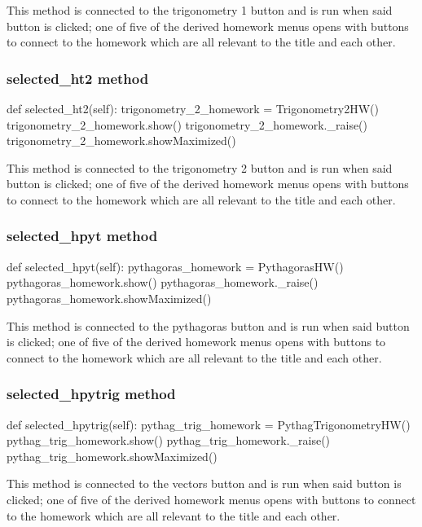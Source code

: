 This method is connected to the trigonometry 1 button and is run when said button is clicked; one of five of the derived homework menus opens with buttons to connect to the homework which are all relevant to the title and each other.

\subsubsection{selected\_ht2 method}

\begin{python}
def selected_ht2(self):
        trigonometry_2_homework = Trigonometry2HW()
        trigonometry_2_homework.show()
        trigonometry_2_homework._raise()
        trigonometry_2_homework.showMaximized()
\end{python}

This method is connected to the trigonometry 2 button and is run when said button is clicked; one of five of the derived homework menus opens with buttons to connect to the homework which are all relevant to the title and each other.

\subsubsection{selected\_hpyt method}

\begin{python}
def selected_hpyt(self):
        pythagoras_homework = PythagorasHW()
        pythagoras_homework.show()
        pythagoras_homework._raise()
        pythagoras_homework.showMaximized()
\end{python}

This method is connected to the pythagoras button and is run when said button is clicked; one of five of the derived homework menus opens with buttons to connect to the homework which are all relevant to the title and each other.

\subsubsection{selected\_hpytrig method}

\begin{python}
def selected_hpytrig(self):
        pythag_trig_homework = PythagTrigonometryHW()
        pythag_trig_homework.show()
        pythag_trig_homework._raise()
        pythag_trig_homework.showMaximized()
\end{python}

This method is connected to the vectors button and is run when said button is clicked; one of five of the derived homework menus opens with buttons to connect to the homework which are all relevant to the title and each other.

